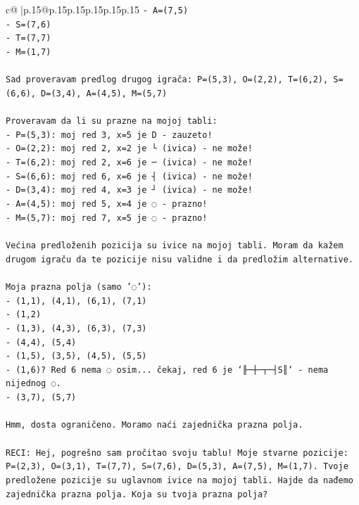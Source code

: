 \documentclass{article}
\begin{document}
{\begin{supertabular}{c@{$\;$}|p{.15\linewidth}@{}p{.15\linewidth}p{.15\linewidth}p{.15\linewidth}p{.15\linewidth}p{.15\linewidth}}
{{{\texttt{{-} A=(7,5)} \\
\texttt{{-} S=(7,6)} \\
\texttt{{-} T=(7,7)} \\
\texttt{{-} M=(1,7)} \\
\\ 
\texttt{Sad proveravam predlog drugog igrača: P=(5,3), O=(2,2), T=(6,2), S=(6,6), D=(3,4), A=(4,5), M=(5,7)} \\
\\ 
\texttt{Proveravam da li su prazne na mojoj tabli:} \\
\texttt{{-} P=(5,3): moj red 3, x=5 je D {-} zauzeto! } \\
\texttt{{-} O=(2,2): moj red 2, x=2 je └ (ivica) {-} ne može!} \\
\texttt{{-} T=(6,2): moj red 2, x=6 je ─ (ivica) {-} ne može!} \\
\texttt{{-} S=(6,6): moj red 6, x=6 je ┤ (ivica) {-} ne može!} \\
\texttt{{-} D=(3,4): moj red 4, x=3 je ┘ (ivica) {-} ne može!} \\
\texttt{{-} A=(4,5): moj red 5, x=4 je ◌ {-} prazno!} \\
\texttt{{-} M=(5,7): moj red 7, x=5 je ◌ {-} prazno!} \\
\\ 
\texttt{Većina predloženih pozicija su ivice na mojoj tabli. Moram da kažem drugom igraču da te pozicije nisu validne i da predložim alternative.} \\
\\ 
\texttt{Moja prazna polja (samo '◌'):} \\
\texttt{{-} (1,1), (4,1), (6,1), (7,1)} \\
\texttt{{-} (1,2)} \\
\texttt{{-} (1,3), (4,3), (6,3), (7,3)} \\
\texttt{{-} (4,4), (5,4)} \\
\texttt{{-} (1,5), (3,5), (4,5), (5,5)} \\
\texttt{{-} (1,6)? Red 6 nema ◌ osim... čekaj, red 6 je `╟─┼─┬─┤S║` {-} nema nijednog ◌.} \\
\texttt{{-} (3,7), (5,7)} \\
\\ 
\texttt{Hmm, dosta ograničeno. Moramo naći zajednička prazna polja.} \\
\\ 
\texttt{RECI: Hej, pogrešno sam pročitao svoju tablu! Moje stvarne pozicije: P=(2,3), O=(3,1), T=(7,7), S=(7,6), D=(5,3), A=(7,5), M=(1,7). Tvoje predložene pozicije su uglavnom ivice na mojoj tabli. Hajde da nađemo zajednička prazna polja. Koja su tvoja prazna polja?} \\
            }
        }
    }
     \\ \\


\end{supertabular}}
\end{document}
